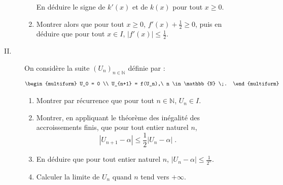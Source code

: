 \begin{description}
\begin{description}
\begin{enumerate}
                                          En d\'eduire le signe de $k'(x)$ et de $k(x)$ pour tout $x \geq 0$.
                                    \item Montrer alors que pour tout $x \geq 0$, $f'(x) + \frac{1}{2} \geq 0$,
                                          puis en d\'eduire que pour tout $x \in I$, $|f'(x)| \leq \frac{1}{2}$.
                              \end{enumerate}
                        \item[II. ]
                              On consid\`ere la suite $(U_n)_{n\in\mathbb{N}}$ d\'efinie par : 
                              \[
                                    \begin{multiform}
                                          U_0 = 0 \\
                                          U_{n+1} = f(U_n),\ n \in \mathbb{N} \;.
                                    \end{multiform}
                              \]
                              \begin{enumerate}
                                    \item Montrer par r\'ecurrence que pour tout $n\in\mathbb{N}$, $U_n \in I$.
                                    \item Montrer, en appliquant le th\'eor\`eme des in\'egalit\'e des accroissements finis,
                                          que pour tout entier naturel $n$,
                                          \[
                                                | U_{n+1} - \alpha | \leq \frac{1}{2} | U_n - \alpha | \;.
                                          \]
                                    \item En d\'eduire que pour tout entier naturel $n$, $|U_n - \alpha| \leq \frac{1}{2^n}$.
                                    \item Calculer la limite de $U_n$ quand $n$ tend vers $+\infty$.
                              \end{enumerate}
                  \end{description}
      \end{description}





































